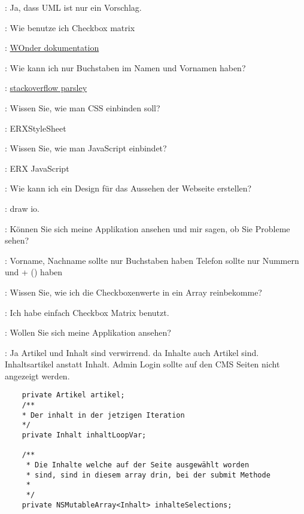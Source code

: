 \documentclass[a4paper, 11pt]{article}
\begin{document}
\begin{drama}
\dozentspeaks: Ja, dass UML ist nur ein Vorschlag.

\msspeaks: Wie benutze ich Checkbox matrix

\internetspeaks: \href{https://github.com/wocommunity/wonder/blob/4d7f6bf9236c3005359101d6f3c9e6224d47750e/Frameworks/Core/JavaWOExtensions/Sources/com/webobjects/woextensions/WOCheckboxMatrix.java}{WOnder dokumentation}

\msspeaks: Wie kann ich nur Buchstaben im Namen und Vornamen haben?

\internetspeaks: \href{https://stackoverflow.com/questions/23415795/how-to-only-allow-text-in-parsely-js-validation}{stackoverflow parsley}

\msspeaks: Wissen Sie, wie man CSS einbinden soll?

\lucasspeaks: ERXStyleSheet

\msspeaks: Wissen Sie, wie man JavaScript einbindet?

\lucasspeaks: ERX JavaScript

\msspeaks: Wie kann ich ein Design für das Aussehen der Webseite erstellen?

\lucasspeaks: draw io.

\msspeaks: Können Sie sich meine Applikation ansehen und mir sagen, ob Sie Probleme sehen?

\lucasspeaks:
    Vorname, Nachname sollte nur Buchstaben haben
    Telefon sollte nur Nummern und + () haben

\msspeaks: Wissen Sie, wie ich die Checkboxenwerte in ein Array reinbekomme?

\standhardspeaks: Ich habe einfach Checkbox Matrix benutzt.

\msspeaks: Wollen Sie sich meine Applikation ansehen?

\fuscospeaks: Ja
    Artikel und Inhalt sind verwirrend. da Inhalte auch Artikel sind. Inhaltsartikel anstatt Inhalt.
    Admin Login sollte auf den CMS Seiten nicht angezeigt werden.

\end{drama}

\begin{verbatim}
	private Artikel artikel;
	/**
	* Der inhalt in der jetzigen Iteration
	*/
	private Inhalt inhaltLoopVar;
	
	/**
	 * Die Inhalte welche auf der Seite ausgewählt worden
	 * sind, sind in diesem array drin, bei der submit Methode
	 * 
	 */
	private NSMutableArray<Inhalt> inhalteSelections;
	\end{verbatim}
\end{document}
